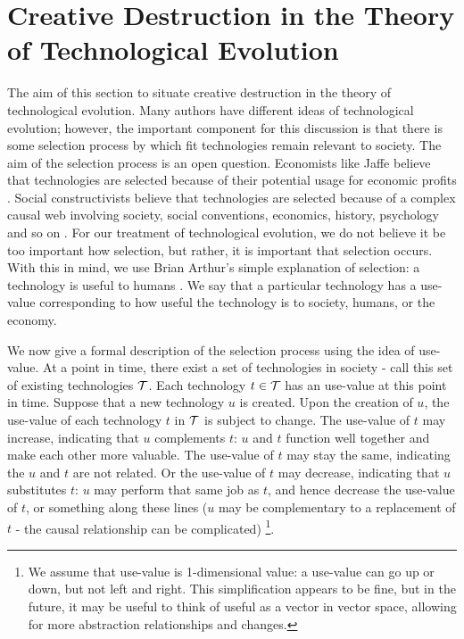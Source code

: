\documentclass[11pt]{article}
\begin{document}
\section{Creative Destruction in the Theory of Technological Evolution}
The aim of this section to situate creative destruction in the theory of technological evolution.
Many authors have different ideas of technological evolution; however, the important component for this discussion is that there is some selection process by which fit technologies remain relevant to society.
The aim of the selection process is an open question.
Economists like Jaffe believe that technologies are selected because of their potential usage for economic profits \cite{jaffe}.
Social constructivists believe that technologies are selected because of a complex causal web involving society, social conventions, economics, history, psychology and so on \cite{scot}.
For our treatment of technological evolution, we do not believe it be too important how selection, but rather, it is important that selection occurs. 
With this in mind, we use Brian Arthur's simple explanation of selection: a technology is useful to humans \cite{arthur}.
We say that a particular technology has a use-value corresponding to how useful the technology is to society, humans, or the economy. 

We now give a formal description of the selection process using the idea of use-value. 
At a point in time, there exist a set of technologies in society - call this set of existing technologies $\mathcal{T}$. 
Each technology $t \in \mathcal{T}$ has an use-value at this point in time. 
Suppose that a new technology $u$ is created.
Upon the creation of $u$, the use-value of each technology $t$ in $\mathcal{T}$ is subject to change.
The use-value of $t$ may increase, indicating that $u$ complements $t$: $u$ and $t$ function well together and make each other more valuable.
The use-value of $t$ may stay the same, indicating the $u$ and $t$ are not related.
Or the use-value of $t$ may decrease, indicating that $u$ substitutes $t$: $u$ may perform that same job as $t$, and hence decrease the use-value of $t$, or something along these lines ($u$ may be complementary to a replacement of $t$ - the causal relationship can be complicated)
\footnote{We assume that use-value is 1-dimensional value: a use-value can go up or down, but not left and right. 
This simplification appears to be fine, but in the future, it may be useful to think of useful as a vector in vector space, allowing for more abstraction relationships and changes.}.
\end{document}
